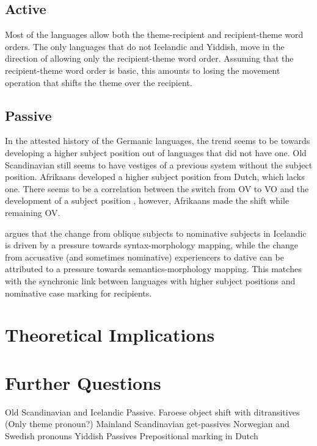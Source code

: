 \section{Active}
Most of the languages allow both the theme-recipient and recipient-theme word orders. The only languages that do not Icelandic and Yiddish, move in the direction of allowing only the recipient-theme word order. Assuming that the recipient-theme word order is basic, this amounts to losing the movement operation that shifts the theme over the recipient.
\section{Passive}
In the attested history of the Germanic languages, the trend seems to be towards developing a higher subject position out of languages that did not have one. Old Scandinavian still seems to have vestiges of a previous system without the subject position. Afrikaans developed a higher subject position from Dutch, which lacks one. There seems to be a correlation between the switch from OV to VO and the development of a subject position \citep{Besten.1990}, however, Afrikaans made the shift while remaining OV.

\cite{Eythorsson.2000} argues that the change from oblique subjects to nominative subjects in Icelandic is driven by a pressure towards syntax-morphology mapping, while the change from accusative (and sometimes nominative) experiencers to dative can be attributed to a pressure towards semantics-morphology mapping. This matches with the synchronic link between languages with higher subject positions and nominative case marking for recipients.

\chapter{Theoretical Implications}\label{chap:theory}
\chapter{Further Questions}\label{chap:furtherquest}
Old Scandinavian and Icelandic Passive.
Faroese object shift with ditransitives (Only theme pronoun?)
Mainland Scandinavian get-passives
Norwegian and Swedish pronouns
Yiddish Passives
Prepositional marking in Dutch
